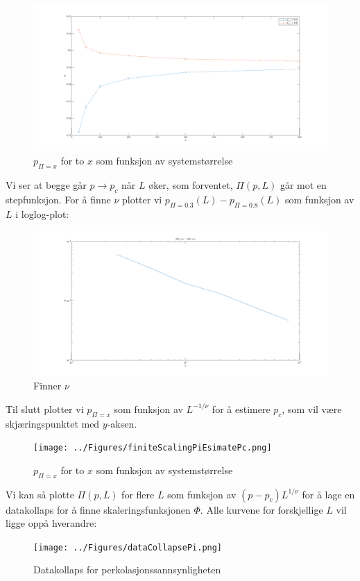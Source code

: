 \documentclass[english, a4paper]{article}
\begin{document}
\begin{figure}[H]
  \begin{center}
  \includegraphics[width = 140mm]{../Figures/finiteScaling2.png}
  \caption{$p_{\Pi=x}$ for to $x$ som funksjon av systemstørrelse}
  \label{fig:fig10}
  \end{center}
\end{figure}
Vi ser at begge går $p\to p_c$ når $L$ øker, som forventet, $\Pi(p,L)$ går mot en stepfunksjon. For 
å finne $\nu$ plotter vi $p_{\Pi=0.3}(L) - p_{\Pi=0.8}(L)$ som funksjon av $L$ i loglog-plot:
\begin{figure}[H]
  \begin{center}
  \includegraphics[width = 140mm]{../Figures/finiteScalingDp.png}
  \caption{Finner $\nu$}
  \label{fig:fig10}
  \end{center}
\end{figure}
Til slutt plotter vi $p_{\Pi=x}$ som funksjon av $L^{-1/\nu}$ for å estimere $p_c$, som vil være
skjæringspunktet med $y$-aksen. 
\begin{figure}[H]
  \begin{center}
  \texttt{[image: ../Figures/finiteScalingPiEsimatePc.png]}
  \caption{$p_{\Pi=x}$ for to $x$ som funksjon av systemstørrelse}
  \label{fig:fig10}
  \end{center}
\end{figure}
Vi kan så plotte $\Pi(p,L)$ for flere $L$ som funksjon av $(p-p_c)L^{1/\nu}$ for å lage en datakollaps
for å finne skaleringsfunksjonen $\Phi$. Alle kurvene for forskjellige $L$ vil ligge oppå hverandre:
\begin{figure}[H]
  \begin{center}
  \texttt{[image: ../Figures/dataCollapsePi.png]}
  \caption{Datakollaps for perkolasjonssannsynligheten}
  \label{fig:fig10}
  \end{center}
\end{figure}
\end{document}

